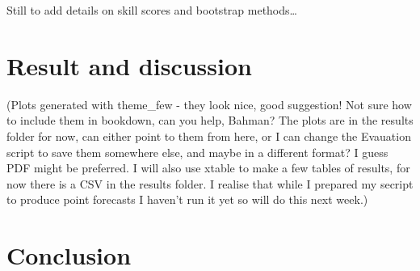 \documentclass[]{elsarticle} %
\begin{document}
Still to add details on skill scores and bootstrap methods\ldots{}

\hypertarget{result}{%
\section{Result and discussion}\label{result}}

(Plots generated with theme\_few - they look nice, good suggestion! Not sure how to include them in bookdown, can you help, Bahman? The plots are in the results folder for now, can either point to them from here, or I can change the Evauation script to save them somewhere else, and maybe in a different format? I guess PDF might be preferred. I will also use xtable to make a few tables of results, for now there is a CSV in the results folder. I realise that while I prepared my secript to produce point forecasts I haven't run it yet so will do this next week.)

\hypertarget{conclusion}{%
\section{Conclusion}\label{conclusion}}

\renewcommand\refname{References}

\end{document}
